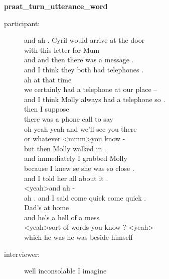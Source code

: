 \documentclass{article}
\newcommand{\turn}[2]{
\item[#1:] #2
}
\begin{document}
\begin{center}\textbf{praat\_turn\_utterance\_word}\end{center}

\begin{description}

\turn{participant}{and ah . Cyril would arrive at the door\\
with this letter for Mum\\
and and then there was a message .\\
and I think they both had telephones .\\
ah at that time\\
we certainly had a telephone at our place --\\
and I think Molly always had a telephone so .\\
then I suppose\\
there was a phone call to say\\
oh yeah yeah and we'll see you there\\
or whatever \textless mmm\textgreater  you know -\\
but then Molly walked in .\\
and immediately I grabbed Molly\\
because I knew se she was so close .\\
and I told her all about it .\\
\textless yeah\textgreater  and ah -\\
ah . and I said come quick come quick .\\
Dad's at home\\
and he's a hell of a mess\\
\textless yeah\textgreater  sort of words you know ? \textless yeah\textgreater \\
which he was he was beside himself}

\turn{interviewer}{well inconsolable I imagine}


\end{description}
\end{document}

